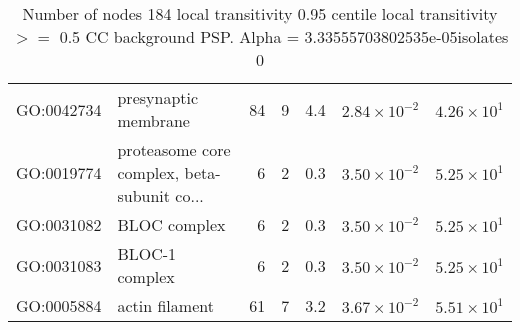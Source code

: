 \begin{table}[ht]
\begin{adjustbox}{max width=\textwidth}
\begin{tabular}{llrrrrr}
  GO:0042734 & presynaptic membrane & 84 & 9 & 4.4 & $2.84 \times 10^{-2}$ & $4.26 \times 10^{1}$ \\ 
  GO:0019774 & proteasome core complex, beta-subunit co... & 6 & 2 & 0.3 & $3.50 \times 10^{-2}$ & $5.25 \times 10^{1}$ \\ 
  GO:0031082 & BLOC complex & 6 & 2 & 0.3 & $3.50 \times 10^{-2}$ & $5.25 \times 10^{1}$ \\ 
  GO:0031083 & BLOC-1 complex & 6 & 2 & 0.3 & $3.50 \times 10^{-2}$ & $5.25 \times 10^{1}$ \\ 
  GO:0005884 & actin filament & 61 & 7 & 3.2 & $3.67 \times 10^{-2}$ & $5.51 \times 10^{1}$ \\ 
   \hline
\end{tabular}
\end{adjustbox}
\caption{Number of nodes 184 local transitivity 0.95 centile  local transitivity $>=$ 0.5 CC background PSP. Alpha = 3.33555703802535e-05isolates 0} 
\label{tab:Number of nodes 184 local transitivity 0.95 centile  local transitivity $>=$ 0.5 CC background PSP. Alpha = 3.33555703802535e-05isolates 0}
\end{table}


